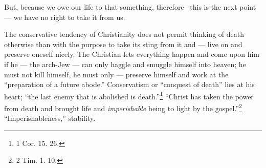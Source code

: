 But, because we owe our life to that something, therefore --this is the next 
point --- we have no right to take it from us.

The conservative tendency of Christianity does not permit thinking of death 
otherwise than with the purpose to take its sting from it and --- live on and 
preserve oneself nicely. The Christian lets everything happen and come upon 
him if he --- the arch-Jew --- can only haggle and smuggle himself into heaven; 
he must not kill himself, he must only --- preserve himself and work at the 
``preparation of a future abode.'' Conservatism or ``conquest of death'' 
lies at his heart; ``the last enemy that is abolished is death.''\footnote{1 
Cor. 15. 26.} ``Christ has taken the power from death and brought life and 
\textit{imperishable} being to light by the gospel.''\footnote{2 Tim. 1. 10.} 
``Imperishableness,'' stability.

